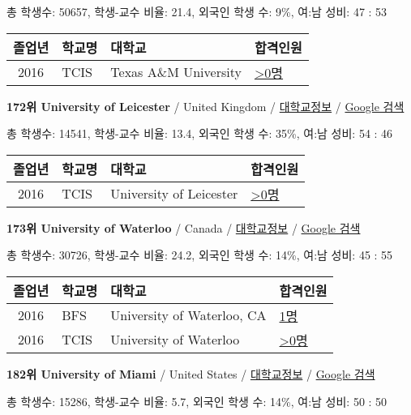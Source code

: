 \documentclass[13pt,]{article}
\begin{document}
총 학생수: 50657, 학생-교수 비율: 21.4, 외국인 학생 수: 9\%, 여:남 성비:
47 : 53

\begin{longtable}[]{@{}clll@{}}
\toprule
졸업년 & 학교명 & 대학교 & 합격인원\tabularnewline
\midrule
\endhead
2016 & TCIS & Texas A\&M University &
\href{http://cafe.naver.com/assarabia/11598}{\textgreater{}0명}\tabularnewline
\bottomrule
\end{longtable}

\textbf{172위 University of Leicester} / United Kingdom /
\href{https://www.timeshighereducation.com/world-university-rankings/university-of-leicester?ranking-dataset=589595}{대학교정보}
/ \href{http://www.google.com/search?q=University+of+Leicester}{Google
검색}

총 학생수: 14541, 학생-교수 비율: 13.4, 외국인 학생 수: 35\%, 여:남
성비: 54 : 46

\begin{longtable}[]{@{}clll@{}}
\toprule
졸업년 & 학교명 & 대학교 & 합격인원\tabularnewline
\midrule
\endhead
2016 & TCIS & University of Leicester &
\href{http://cafe.naver.com/assarabia/11598}{\textgreater{}0명}\tabularnewline
\bottomrule
\end{longtable}

\textbf{173위 University of Waterloo} / Canada /
\href{https://www.timeshighereducation.com/world-university-rankings/university-of-waterloo?ranking-dataset=589595}{대학교정보}
/ \href{http://www.google.com/search?q=University+of+Waterloo}{Google
검색}

총 학생수: 30726, 학생-교수 비율: 24.2, 외국인 학생 수: 14\%, 여:남
성비: 45 : 55

\begin{longtable}[]{@{}clll@{}}
\toprule
졸업년 & 학교명 & 대학교 & 합격인원\tabularnewline
\midrule
\endhead
2016 & BFS & University of Waterloo, CA &
\href{http://cafe.naver.com/assarabia/11597}{1명}\tabularnewline
2016 & TCIS & University of Waterloo &
\href{http://cafe.naver.com/assarabia/11598}{\textgreater{}0명}\tabularnewline
\bottomrule
\end{longtable}

\textbf{182위 University of Miami} / United States /
\href{https://www.timeshighereducation.com/world-university-rankings/university-of-miami?ranking-dataset=589595}{대학교정보}
/ \href{http://www.google.com/search?q=University+of+Miami}{Google 검색}

총 학생수: 15286, 학생-교수 비율: 5.7, 외국인 학생 수: 14\%, 여:남 성비:
50 : 50
\end{document}
